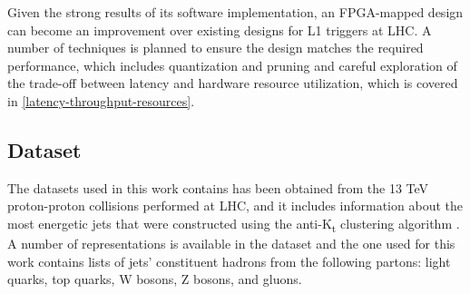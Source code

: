 Given the strong results of its software implementation, an FPGA-mapped design can become an improvement over existing designs for L1 triggers at LHC. A number of techniques is planned to ensure the design matches the required performance, which includes quantization and pruning \cite{45-liang2021pruning} and careful exploration of the trade-off between latency and hardware resource utilization, which is covered in \autoref{latency-throughput-resources}.


\subsection{Dataset}
The datasets used in this work contains has been obtained from the 13 TeV proton-proton collisions performed at LHC, and it includes information about the most energetic jets \cite{31-pierinihls4ml,32-pierinihls4ml,33-pierinihls4ml,34-pierinihls4ml} that were constructed using the anti-K\textsubscript{t} clustering algorithm \cite{35-cacciari2008anti-kt}. A number of representations is available in the dataset and the one used for this work contains lists of jets' constituent hadrons from the following partons: light quarks, top quarks, W bosons, Z bosons, and gluons.


